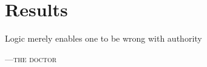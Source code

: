 %
%

\chapter{Results}
\label{ch:results}


\epigraph{Logic merely enables one to be wrong with authority}%
{\textsc{---the doctor}} %

% 

